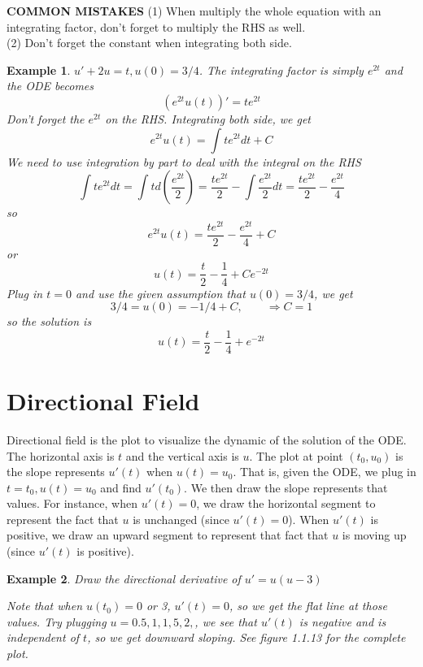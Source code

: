 \documentclass[10pt]{amsart}
\newtheorem{example}{Example}
\renewcommand{\ni}{\noindent}
\newcommand{\tf}{\textbf}
\begin{document}
\ni\tf{COMMON MISTAKES} (1) When multiply the whole equation with an integrating factor, don't forget to multiply the RHS as well. \\
(2) Don't forget the constant when integrating both side. \\

\begin{example} $u' +2u = t, u(0) = 3/4$. The integrating factor is simply $e^{2t}$ and the ODE becomes
$$ (e^{2t}u(t))' = te^{2t} $$
Don't forget the $e^{2t}$ on the RHS. Integrating both side, we get
$$ e^{2t}u(t) = \int te^{2t}dt + C $$
We need to use integration by part to deal with the integral on the RHS
$$ \int t e^{2t} dt = \int t d(\frac{e^{2t}}{2}) = \frac{te^{2t}}{2} - \int \frac{e^{2t}}{2} dt = \frac{te^{2t}}{2}-\frac{e^{2t}}{4}  $$
so 
$$ e^{2t}u(t)  = \frac{te^{2t}}{2}-\frac{e^{2t}}{4}  + C$$
or 
$$ u(t) = \frac{t}{2}-\frac{1}{4}  + Ce^{-2t} $$
Plug in $t=0$ and use the given assumption that $u(0) = 3/4$, we get
$$ 3/4 = u(0) = -1/4 + C ,\qquad \Rightarrow C = 1 $$
so the solution is
$$ u(t) =  \frac{t}{2}-\frac{1}{4}  + e^{-2t} $$
\end{example}

\vspace{0.2in}
\section{Directional Field}
Directional field is the plot to visualize the dynamic of the solution of the ODE. The horizontal axis is $t$ and the vertical axis is $u$. The plot at point $(t_{0},u_{0})$ is the slope represents $u'(t)$ when $u(t)=u_{0}$. That is, given the ODE, we plug in $t=t_{0}, u(t) = u_{0}$ and find $u'(t_{0})$. We then draw the slope represents that values. For instance, when $u'(t) = 0$, we draw the horizontal segment to represent the fact that $u$ is unchanged (since $u'(t) = 0$). When $u'(t)$ is positive, we draw an upward segment to represent that fact that $u$ is moving up (since $u'(t)$ is positive). 

\begin{example} Draw the directional derivative of $u' = u(u-3) $

Note that when $u(t_{0}) = 0$ or 3, $u'(t) = 0$, so we get the flat line at those values. Try plugging $u = 0.5,1,1,5,2,$, we see that $u'(t)$ is negative and is independent of $t$, so we get downward sloping. See figure 1.1.13 for the complete plot.   

\end{example}



 
\end{document}
